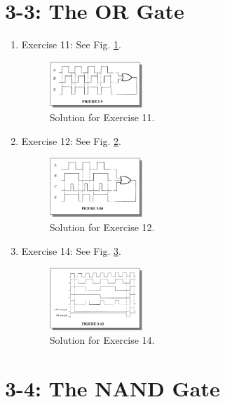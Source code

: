 \documentclass[10pt]{article}
\begin{document}
\clearpage

\section{3-3: The OR Gate}

\begin{enumerate}
\item Exercise 11: See Fig. \ref{fig:or1}.
\begin{figure}[ht]
\centering
\includegraphics[width=0.33\textwidth]{figures/or1.png}
\caption{\label{fig:or1} Solution for Exercise 11.}
\end{figure}
\item Exercise 12: See Fig. \ref{fig:or2}.
\begin{figure}[ht]
\centering
\includegraphics[width=0.33\textwidth]{figures/or2.png}
\caption{\label{fig:or2} Solution for Exercise 12.}
\end{figure}
\item Exercise 14: See Fig. \ref{fig:or3}.
\begin{figure}[ht]
\centering
\includegraphics[width=0.33\textwidth]{figures/or3.png}
\caption{\label{fig:or3} Solution for Exercise 14.}
\end{figure}
\end{enumerate}

\section{3-4: The NAND Gate}
\end{document}
